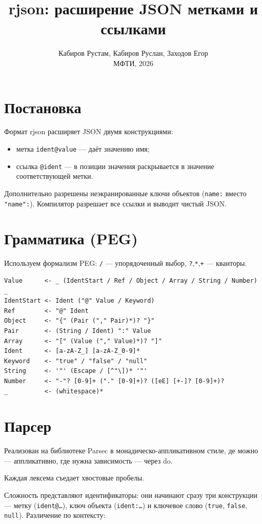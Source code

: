 \documentclass[a4paper,11pt]{article}
\title{rjson: расширение JSON метками и ссылками}
\author{Кабиров Рустам, Кабиров Руслан, Заходов Егор\\ МФТИ, 2026}
\date{}
\begin{document}
\maketitle

\section{Постановка}

Формат rjson расширяет JSON двумя конструкциями:
\begin{itemize}
  \item метка \texttt{ident@value} — даёт значению имя;
  \item ссылка \texttt{@ident} — в позиции значения раскрывается в
        значение соответствующей метки.
\end{itemize}
Дополнительно разрешены неэкранированные ключи объектов
(\texttt{name:} вместо \texttt{"name":}). Компилятор разрешает все
ссылки и выводит чистый JSON.

\section{Грамматика (PEG)}

Используем формализм PEG: \texttt{/} — упорядоченный выбор,
\texttt{?},\texttt{*},\texttt{+} — кванторы.
\begin{lstlisting}
Value      <- _ (IdentStart / Ref / Object / Array / String / Number) _
IdentStart <- Ident ("@" Value / Keyword)
Ref        <- "@" Ident
Object     <- "{" (Pair ("," Pair)*)? "}"
Pair       <- (String / Ident) ":" Value
Array      <- "[" (Value ("," Value)*)? "]"
Ident      <- [a-zA-Z_] [a-zA-Z_0-9]*
Keyword    <- "true" / "false" / "null"
String     <- '"' (Escape / [^"\])* '"'
Number     <- "-"? [0-9]+ ("." [0-9]+)? ([eE] [+-]? [0-9]+)?
_          <- (whitespace)*
\end{lstlisting}

\section{Парсер}

Реализован на библиотеке Parsec в монадическо-аппликативном стиле, де можно — аппликативно, где нужна зависимость — через do.

Каждая лексема съедает хвостовые пробелы.

Сложность представляют идентификаторы: они начинают сразу три
конструкции — метку (\texttt{ident@\ldots}), ключ объекта
(\texttt{ident:\ldots}) и ключевое слово (\texttt{true}, \texttt{false},
\texttt{null}). Различение по контексту:
\end{document}
